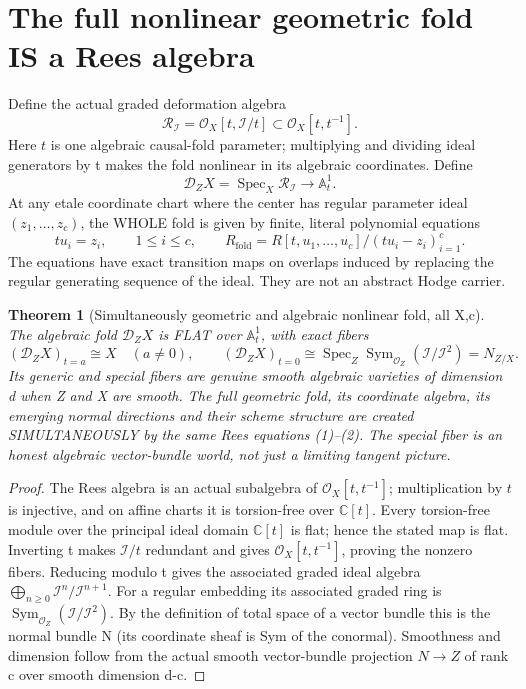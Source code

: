 \documentclass[11pt]{article}
\newtheorem{theorem}{Theorem}[section]
\begin{document}
\section{The full nonlinear geometric fold IS a Rees algebra}
Define the actual graded deformation algebra
\[
 \boxed{
 \mathcal R_{\mathcal I}
   =\mathcal O_X[t,\mathcal I/t]
   \subset \mathcal O_X[t,t^{-1}].
 }                                                       \tag{1}
\]
Here $t$ is one algebraic causal-fold parameter; multiplying
and dividing ideal generators by t makes the fold nonlinear
in its algebraic coordinates. Define
\[
 \mathscr D_ZX=\operatorname{Spec}_X
                       \mathcal R_{\mathcal I}
      \longrightarrow \mathbb A^1_t .
\]
At any etale coordinate chart where the center has regular
parameter ideal $(z_1,\ldots,z_c)$, the WHOLE fold is given
by finite, literal polynomial equations
\[
 \boxed{
 t u_i=z_i,\qquad 1\le i\le c,\qquad
 R_{\mathrm{fold}}
   =R[t,u_1,\ldots,u_c]/(t u_i-z_i)_{i=1}^c.
 }                                                       \tag{2}
\]
The equations have exact transition maps on overlaps
induced by replacing the regular generating sequence
of the ideal. They are not an abstract Hodge carrier.

\begin{theorem}[Simultaneously geometric and algebraic nonlinear fold, all X,c]
The algebraic fold $\mathscr D_ZX$ is FLAT over
$\mathbb A^1_t$, with exact fibers
\[
 \boxed{
 (\mathscr D_ZX)_{t=a}
       \cong X\quad(a\ne0),\qquad
 (\mathscr D_ZX)_{t=0}
       \cong\operatorname{Spec}_Z
         \operatorname{Sym}_{\mathcal O_Z}
                     (\mathcal I/\mathcal I^2)
       =N_{Z/X}.
 }                                                       \tag{3}
\]
Its generic and special fibers are genuine smooth algebraic
varieties of dimension d when Z and X are smooth.
The full geometric fold, its coordinate algebra,
its emerging normal directions and their scheme structure
are created SIMULTANEOUSLY by the same Rees equations (1)--(2).
The special fiber is an honest algebraic vector-bundle world,
not just a limiting tangent picture.
\end{theorem}
\begin{proof}
The Rees algebra is an actual subalgebra of
$\mathcal O_X[t,t^{-1}]$; multiplication by $t$
is injective, and on affine charts it is torsion-free
over $\mathbb C[t]$. Every torsion-free module over
the principal ideal domain $\mathbb C[t]$ is flat;
hence the stated map is flat.
Inverting t makes $\mathcal I/t$ redundant and gives
$\mathcal O_X[t,t^{-1}]$, proving the nonzero fibers.
Reducing modulo t gives the associated graded ideal algebra
$\bigoplus_{n\ge0}\mathcal I^n/\mathcal I^{n+1}$.
For a regular embedding its associated graded ring is
$\operatorname{Sym}_{\mathcal O_Z}(\mathcal I/\mathcal I^2)$.
By the definition of total space of a vector bundle this
is the normal bundle N (its coordinate sheaf is
Sym of the conormal). Smoothness and dimension follow
from the actual smooth vector-bundle projection
$N\to Z$ of rank c over smooth dimension d-c.
\end{proof}
\end{document}
